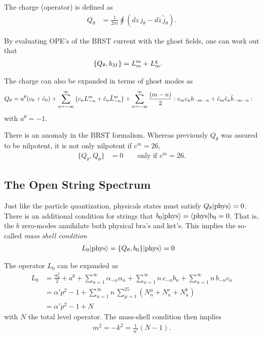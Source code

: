 \documentclass[notitlepage,amsmath,amssymb,aps, pra, 10pt]{revtex4-1}
\begin{document}
    The charge (operator) is defined as
    \begin{align}
        Q_{\theta} &= \frac{1}{2\pi i} \oint ( dz \, j_{\theta} - d\overline z \, \tilde j_{\theta}).
    \end{align}

    By evaluating OPE's of the BRST current with the ghost fields, one can work out that
    \begin{align}
        \{Q_{\theta} , b_M \} &= L_m^{\rm m} + L_m^{\rm g}.
    \end{align}

    The charge can also be expanded in terms of ghost modes as
    \begin{align}
        Q_{\theta} &= a^{\theta}(c_0 + \tilde c_0)
         +
        \sum_{n=-\infty}^{\infty}  \left(c_n L_{-n}^{\rm m} + \tilde c_n \tilde L_{-n}^{\rm m}\right)
        +
        \sum_{n=-\infty}^{\infty}\frac{ (m-n)}{2} : c_m c_n b_{-m-n} +  \tilde c_m \tilde c_n \tilde b_{-m-n}:
    \end{align}
    with $a^{\theta} = -1$.

    There is an anomaly in the BRST formalism. Whereas previously $Q_{\theta}$ was assured to be nilpotent, it is not only nilpotent if $c^m = 26$,
    \begin{align}
        \{ Q_{\theta} , Q_{\theta} \} &= 0 \qquad \text{only if } c^m = 26.
    \end{align}

    \subsection{The Open String Spectrum}

        Just like the particle quantization, physicals states must satisfy $Q_{\theta}|\rm phys \rangle = 0$. There is an additional condition for strings that $b_0| \rm phys \rangle = \langle \rm phys |b_0 = 0$. That is, the $b$ zero-modes annihilate both physical bra's and ket's. This implies the so-called \emph{mass shell condition}
         \begin{align}
         L_0 | \rm phys \rangle &= \{ Q_{\theta}, b_0\}| \rm phys \rangle= 0
         \end{align}

        The operator $L_0$ can be expanded as
        \begin{align}
            L_0 &= \frac{\alpha_0^2}{2}
            +
            a^{\theta}
            +
            \sum_{n=1}^{\infty} \alpha_{-n} \alpha_n
            +
            \sum_{n=1}^{\infty}n\,c_{-n} b_n
            +
            \sum_{n=1}^{\infty}n\,b_{-n} c_n\\
            &= \alpha' p^2
            - 1
            + \sum_{n=1}^{\infty} n \, \sum_{\mu=1}^{25} \left( N_n^{\mu} + N^{c}_{n} + N^b_n\right)\\
            &= \alpha' p^2 - 1 + N
        \end{align}
        with $N$ the total level operator. The mass-shell condition then implies
        \begin{align}
            m^2 = -k^2 = \frac{1}{\alpha'}(N-1).
        \end{align}
\end{document}
